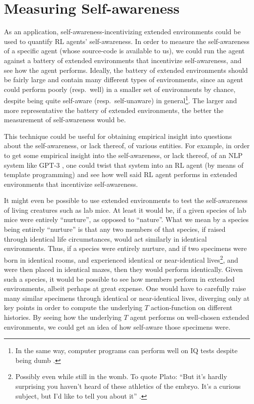 \documentclass[runningheads]{llncs}
\begin{document}
\section{Measuring Self-awareness}

As an application, self-awareness-incentivizing extended environments could be used
to quantify
RL agents' self-awareness.
In order to measure the self-awareness of a specific agent (whose source-code
is available to us), we could run the agent against a battery
of extended environments that incentivize self-awareness, and see how the agent performs.
Ideally, the battery of extended environments should be fairly large and contain many
different types of environments, since an agent could perform poorly (resp.\ well)
in a smaller set of environments by chance, despite being quite
self-aware (resp.\ self-unaware) in general\footnote{In the same way, computer programs can
perform well on IQ tests despite being dumb \cite{sanghi2003computer}.}.
The larger and more representative the battery of extended environments, the better
the measurement of self-awareness would be.

This technique could be useful for obtaining
empirical insight into questions about the self-awareness, or lack thereof, of
various entities. For example, in order to get some empirical insight into the
self-awareness, or lack thereof, of an NLP system like GPT-3
\cite{chalmers}, one could twist that system into an RL agent (by means of template
programming) and see how well said RL agent performs in extended environments that
incentivize self-awareness.

It might even be possible to use extended environments to test the self-awareness
of living creatures such as lab mice. At least it would be, if a given species of
lab mice were entirely ``nurture'', as opposed to ``nature''. What we mean by a
species being entirely ``nurture'' is that any two members of that species,
if raised through identical life circumstances, would act similarly in identical environments.
Thus, if a species were entirely nurture, and if two specimens were born in identical
rooms, and experienced identical or near-identical lives\footnote{Possibly even
while still in the womb. To quote Plato: ``But it's hardly surprising you haven't
heard of these athletics of the embryo. It's a curious subject, but I'd like to
tell you about it'' \cite{platolaws}.},
and were then placed in identical mazes, then they would perform identically.
Given such a species, it would be possible to see how members perform in extended
environments, albeit perhaps at great expense. One would have to carefully raise many
similar specimens through identical or near-identical lives, diverging only at key
points in order to compute the underlying $T$ action-function on different histories.
By seeing how the underlying $T$ agent performs on well-chosen extended environments,
we could get an idea of how self-aware those specimens were.




\end{document}
